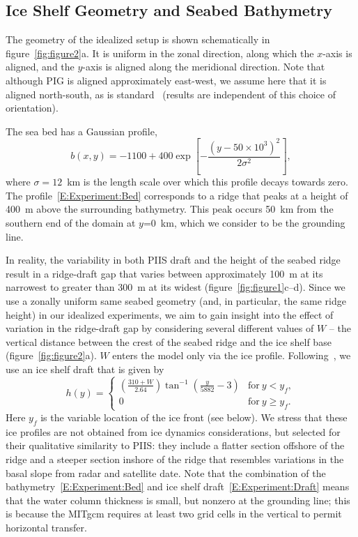 \documentclass[draft]{agujournal2019}
\begin{document}
\subsection{Ice Shelf Geometry and Seabed Bathymetry}\label{S:Experiment:Geometry}
The geometry of the idealized setup is shown schematically in figure~\ref{fig:figure2}a. It is uniform in the zonal direction, along which the $x$-axis is aligned, and the $y$-axis is aligned along the meridional direction. Note that although PIG is aligned approximately east-west, we assume here that it is aligned north-south, as is standard~\cite{Grosfeld1997JGROceans, DeRydt2014JGeophysResOceans} (results are independent of this choice of orientation).

The sea bed has a Gaussian profile,
\begin{equation}\label{E:Experiment:Bed}
    b(x,y) = -1100 + 400 \exp\left[-\frac{\left(y - 50\times 10^3\right)^2}{2\sigma^2}\right],
\end{equation}
where $\sigma = 12$~km is the length scale over which this profile decays towards zero. The profile~\eqref{E:Experiment:Bed} corresponds to a ridge that peaks at a height of 400~m above the surrounding bathymetry. This peak occurs 50 km from the southern end of the domain at $y$=0~km, which we consider to be the grounding line.

In reality, the variability in both PIIS draft and the height of the seabed ridge result in a ridge-draft gap that varies between approximately 100 m at its narrowest to greater than 300 m at its widest (figure~\ref{fig:figure1}c--d). Since we use a zonally uniform same seabed geometry (and, in particular, the same ridge height) in our idealized experiments, we aim to gain insight into the effect of variation in the ridge-draft gap by considering several different values of $W$ -- the vertical distance between the crest of the seabed ridge and the ice shelf base (figure~\ref{fig:figure2}a). $W$ enters the model only via the ice profile. Following~, we use an ice shelf draft that is given by
\begin{equation}\label{E:Experiment:Draft}
    h(y) = \begin{cases}
    \left(\frac{310 + W}{2.64}\right)\tan^{-1}\left(\frac{y}{5882} -3\right) & \text{for}~y < y_f,\\
    0  & \text{for}~y \geq y_f.
    \end{cases}
\end{equation}
Here $y_f$ is the variable location of the ice front (see below). We stress that these ice profiles are not obtained from ice dynamics considerations, but selected for their qualitative similarity to PIIS: they include a flatter section offshore of the ridge and a steeper section inshore of the ridge that resembles variations in the basal slope from radar and satellite date. Note that the combination of the bathymetry~\eqref{E:Experiment:Bed} and ice shelf draft~\eqref{E:Experiment:Draft} means that the water column thickness is small, but nonzero at the grounding line; this is because the MITgcm requires at least two grid cells in the vertical to permit horizontal transfer.
\end{document}
